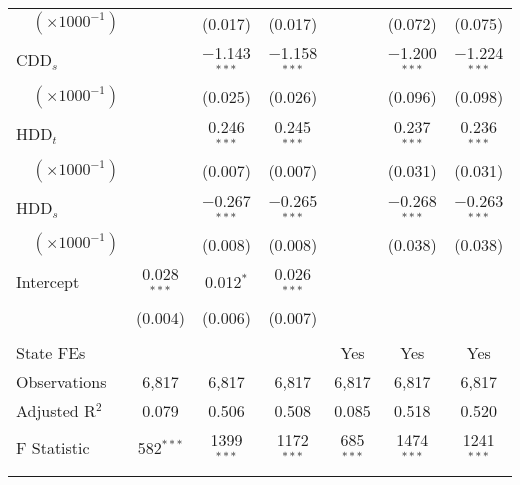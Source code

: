 \documentclass[aspectratio=169]{beamer}
\begin{document}
\begin{frame}
\begin{table}[t]
\begin{tabular}{@{\extracolsep{5pt}}lcccccc}
		$\quad(\times 1000^{-1})$ &  & (0.017) & (0.017) &  & (0.072) & (0.075) \\ 
		CDD$_s$ &  & $-$1.143$^{***}$ & $-$1.158$^{***}$ &  & $-$1.200$^{***}$ & $-$1.224$^{***}$ \\ 
		$\quad(\times 1000^{-1})$&  & (0.025) & (0.026) &  & (0.096) & (0.098) \\ 
		HDD$_t$  &  & 0.246$^{***}$ & 0.245$^{***}$ &  & 0.237$^{***}$ & 0.236$^{***}$ \\ 
		$\quad(\times 1000^{-1})$ &  & (0.007) & (0.007) &  & (0.031) & (0.031) \\ 
		HDD$_s$ &  & $-$0.267$^{***}$ & $-$0.265$^{***}$ &  & $-$0.268$^{***}$ & $-$0.263$^{***}$ \\ 
		$\quad(\times 1000^{-1})$ &  & (0.008) & (0.008) &  & (0.038) & (0.038) \\ 
		Intercept & 0.028$^{***}$ & 0.012$^{*}$ & 0.026$^{***}$ &  &  &  \\ 
		& (0.004) & (0.006) & (0.007) &  &  &  \\  [0.9ex]
		\hline \\[-1.8ex] 
		State FEs &   &   &   & Yes & Yes & Yes \\ 
		Observations & 6,817 & 6,817 & 6,817 & 6,817 & 6,817 & 6,817 \\ 
		Adjusted R$^{2}$ & 0.079 & 0.506 & 0.508 & 0.085 & 0.518 & 0.520 \\  
		F Statistic & 582$^{***}$  & 1399$^{***}$  & 1172$^{***}$ & 685$^{***}$  & 1474$^{***}$  & 1241$^{***}$  \\ [0.5ex]
		\hline 
		\hline \\[-1.8ex] 
	\end{tabular} 
\end{table}

\end{frame}
\end{document}
